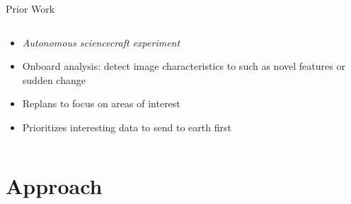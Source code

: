 \documentclass[9pt]{beamer}
\begin{document}
\begin{frame}{Prior Work}
\begin{columns}
\begin{column}{0.50\textwidth}
\begin{block}{}
\begin{itemize}
	                \item \textit{Autonomous sciencecraft experiment}
    	            \item Onboard analysis: detect image characteristics to such as novel features or sudden change
                    \item Replans to focus on areas of interest
	                \item Prioritizes interesting data to send to earth first
                \end{itemize}
            \end{block}
        \end{column}
    \end{columns}
\end{frame}  


\section{Approach}
\end{document}
